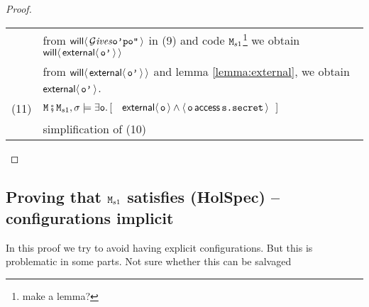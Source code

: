 \documentclass[acmsmall,screen,anonymous,review]{acmart}
\newcommand{\SPACE}{\hspace{1.5in}}
\begin{document}
\begin{proof}
\begin{tabular}{ll}
 & \SPACE from  ${\Future{\Gives {\prg{o'}}{\prg{p}} {\prg{o''}} }}$ in (9) and code $\M_{s1}$\footnote{make a lemma?}
 we obtain ${\Future{\External{\prg{o'}}}}$\\
  & \SPACE from  ${\Future{\External{\prg{o'}}}}$ and lemma \ref{lemma:external}, we obtain $\External{\prg{o'}}$.\\
(11) & $ \M\mkpair \M_{s1}, \sigma  \models  \exists \prg{o}.\,  [\  \ \ \External{\prg{o}} \wedge {\CanAccess {\prg{o}} {\prg{s.secret}} } \ \ ]$\\
& \SPACE simplification of (10)
\end{tabular}



\end{proof}


\subsection{Proving that $\M_{s1}$ satisfies  (HolSpec) -- configurations implicit}

In this proof we try to avoid having explicit configurations. But this is problematic in some parts. Not sure whether this can be 
salvaged
\end{document}

